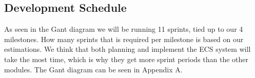 \subsection{Development Schedule}
As seen in the Gant diagram we will be running 11 sprints, tied up to our 4 milestones.
How many sprints that is required per milestone is based on our estimations. 
We think that both planning and implement the ECS system will take the most time,
which is why they get more sprint periods than the other modules.
The Gant diagram can be seen in Appendix A.